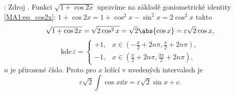\begin{mdframed}[style=mdmathsolution]  
  [\ref{mai:eq147}]: Zdroj \cite[s.~30]{Knichal}. Funkci $\sqrt{1+\cos2x}$ upravíme na základě
  goniometrické identity \ref{MA1:eq_cos2x}: \(1+\cos2x = 1+\cos^2x-\sin^2x=2\cos^2x\) takto
  \begin{equation*}
    \sqrt{1+\cos2x} =\sqrt{2\cos^2x} = \sqrt{2}\abs{\cos x} = \varepsilon\sqrt{2}\cos x, 
  \end{equation*}
  \begin{equation*}
    \text{kde}\,\varepsilon =
      \begin{cases} 
        +1, &  x\in \left(-\frac{\pi}{2}+2n\pi,\frac{\pi}{2}+2n\pi\right), \\
        -1, &  x\in \left(\frac{\pi}{2}+2n\pi,\frac{3\pi}{2}+2n\pi\right),
      \end{cases}
  \end{equation*}
  $n$ je přirozené číslo. Proto pro $x$ ležící v uvedených intervalech je
  \begin{equation*}
    \varepsilon\sqrt{2}\int\cos x\dd{x} = \varepsilon\sqrt{2}\sin x + c.
  \end{equation*}
\end{mdframed}